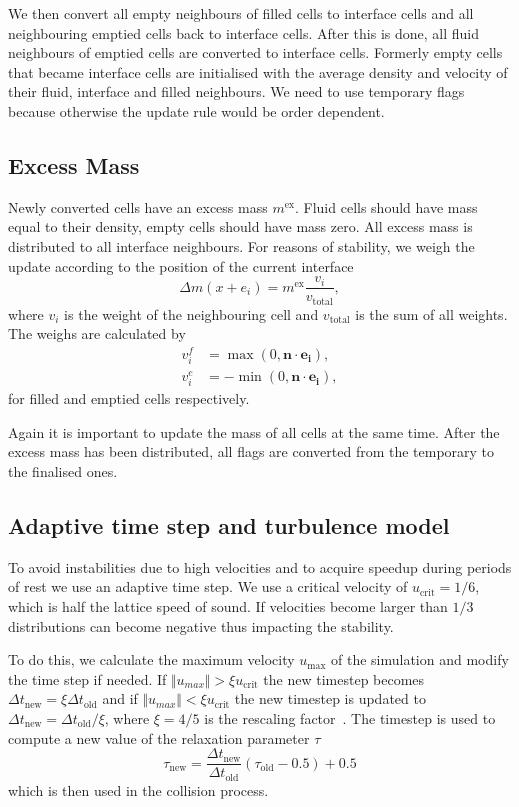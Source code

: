 \documentclass[10pt,a4paper,notitlepage]{article}
\begin{document}
We then convert all empty neighbours of filled cells to interface cells and all neighbouring emptied cells back to interface cells.
After this is done, all fluid neighbours of emptied cells are converted to interface cells.
Formerly empty cells that became interface cells are initialised with the average density and velocity of their fluid, interface and filled neighbours.
We need to use temporary flags because otherwise the update rule would be order dependent.

\subsection{Excess Mass }
Newly converted cells have an excess mass $m^{\text{ex}}$.
Fluid cells should have mass equal to their density, empty cells should have mass zero.
All excess mass is distributed to all interface neighbours.
For reasons of stability, we weigh the update according to the position of the current interface
\begin{equation} \label{eq:exmass}
\Delta m(x+e_{i})=m^{\text{ex}}\frac{v_{i}}{v_{\text{total}}},
\end{equation}
where $v_{i}$ is the weight of the neighbouring cell and $v_{\text{total}}$ is the sum of all weights.
The weighs are calculated by
\begin{align}
  \label{eq:excessMassWeights}
 v_i^f &=  \max(0, \bm{n} \cdot \bm{e_i}),\\
 v_i^e &= - \min(0, \bm{n} \cdot \bm{e_i}),
\end{align}
for filled and emptied cells respectively.

Again it is important to update the mass of all cells at the same time.
After the excess mass has been distributed, all flags are converted from the temporary to the finalised ones.

\subsection{Adaptive time step and turbulence model}
To avoid instabilities due to high velocities and to acquire speedup during periods of rest we use an adaptive time step.
We use a critical velocity of $u_\text{crit} = 1/6$, which is half the lattice speed of sound.
If velocities become larger than $1/3$ distributions can become negative thus impacting the stability.

To do this, we calculate the maximum velocity $u_{\text{max}}$ of the simulation and modify the time step if needed.
If $ \Vert u_{max} \Vert > \xi u_{\text{crit}}$ the new timestep becomes $\Delta t_{\text{new}}= \xi \Delta t_{\text{old}}$ and if 
$\Vert u_{max} \Vert < \xi u_\text{crit}$ the new timestep is updated to $\Delta t_{\text{new}} = \Delta t_{\text{old}} / \xi$,
where $\xi = 4/5$ is the rescaling factor~\cite{thurey2005interactive}.
The timestep is used to compute a new value of the relaxation parameter $\tau$
\begin{equation} \label{eq:omega}
\tau_{\text{new}}= \frac{\Delta t_{\text{new}}}{\Delta t_{\text{old}}} (\tau_{\text{old}}- 0.5) +0.5
\end{equation}
which is then used in the collision process.
\end{document}
